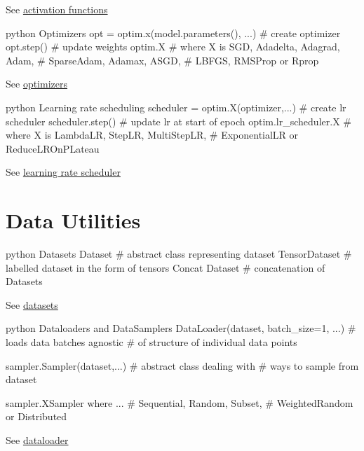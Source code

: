 \documentclass[8pt]{extarticle}
\begin{document}
\begin{multicols}{2}
See
\href{https://pytorch.org/docs/stable/nn.html\#non-linear-activations-weighted-sum-nonlinearity}{activation
functions}

\begin{codebox}{python}{\hypertarget{optimizers}{%
Optimizers\label{optimizers}}}
opt = optim.x(model.parameters(), ...)  # create optimizer
opt.step()                              # update weights
optim.X                                 # where X is SGD, Adadelta, Adagrad, Adam,
                                        # SparseAdam, Adamax, ASGD,
                                        # LBFGS, RMSProp or Rprop
\end{codebox}

See \href{https://pytorch.org/docs/stable/optim.html}{optimizers}

\begin{codebox}{python}{\hypertarget{learning-rate-scheduling}{%
Learning rate scheduling\label{learning-rate-scheduling}}}
scheduler = optim.X(optimizer,...)  # create lr scheduler
scheduler.step()                    # update lr at start of epoch
optim.lr_scheduler.X                # where X is LambdaLR, StepLR, MultiStepLR,
                                    # ExponentialLR or ReduceLROnPLateau
\end{codebox}

See
\href{https://pytorch.org/docs/stable/optim.html\#how-to-adjust-learning-rate}{learning
rate scheduler}

\hypertarget{data-utilities}{%
\section{Data Utilities}\label{data-utilities}}

\begin{codebox}{python}{\hypertarget{datasets}{%
Datasets\label{datasets}}}
Dataset                    # abstract class representing dataset
TensorDataset              # labelled dataset in the form of tensors
Concat Dataset             # concatenation of Datasets
\end{codebox}

See
\href{https://pytorch.org/docs/stable/data.html?highlight=dataset\#torch.utils.data.Dataset}{datasets}

\begin{codebox}{python}{\hypertarget{dataloaders-and-datasamplers}{%
Dataloaders and DataSamplers\label{dataloaders-and-datasamplers}}}
DataLoader(dataset, batch_size=1, ...)  # loads data batches agnostic
                                        # of structure of individual data points

sampler.Sampler(dataset,...)            # abstract class dealing with
                                        # ways to sample from dataset

sampler.XSampler where ...              # Sequential, Random, Subset,
                                        # WeightedRandom or Distributed
\end{codebox}

See
\href{https://pytorch.org/docs/stable/data.html?highlight=dataloader\#torch.utils.data.DataLoader}{dataloader}

\end{multicols}
\end{document}

